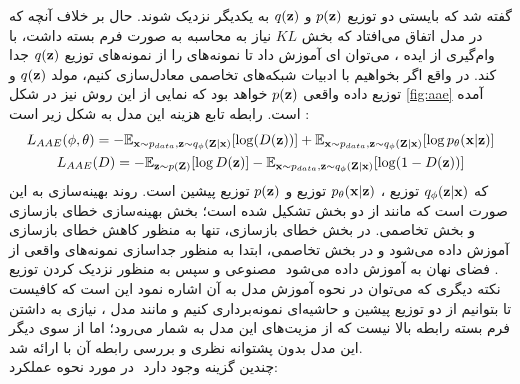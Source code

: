 گفته شد که بایستی دو توزیع $p({\bf z})$ و $q({\bf z})$ به یکدیگر نزدیک شوند. حال بر خلاف آنچه که در مدل \vae{} اتفاق می‌افتاد که بخش $KL$ نیاز به محاسبه به صورت فرم بسته داشت، با وام‌گیری از ایده \gan{}، می‌توان \discriminator ‌ای آموزش داد تا نمونه‌های \priordist{} را از نمونه‌های توزیع \marginal
$q({\bf z})$
جدا کند. در واقع اگر بخواهیم با ادبیات شبکه‌های تخاصمی معادل‌سازی کنیم، مولد $q({\bf z})$ و توزیع داده واقعی $p({\bf z})$ خواهد بود که نمایی از این روش نیز در شکل \ref{fig:aae} آمده است. رابطه تابع هزینه این مدل به شکل زیر است \cite{aae}:
\begin{gather}
	L_{AAE}(\phi, \theta) =
	- \mathbb E_{{\bf x} \sim p_{data}, {\bf z} \sim q_\phi({\bf Z}|{\bf x})} [\log (D({\bf z}))]
	+ \mathbb E_{{\bf x} \sim p_{data}, {\bf z} \sim q_\phi({\bf Z}|{\bf x})}[\log p_\theta({\bf x}|{\bf z})]\\
	L_{AAE}(D) =
	- \mathbb E_{{\bf z} \sim p({\bf Z})} [\log D({\bf z})]
	- \mathbb E_{{\bf x} \sim p_{data},{\bf z} \sim q_\phi({\bf Z}|{\bf x})} [\log (1 - D({\bf z}))]
\end{gather}
که $q_\phi({\bf z}|{\bf x})$ توزیع \encoder{}،
$p_\theta({\bf x}|{\bf z})$
توزیع \decoder{} و $p({\bf z})$ توزیع پیشین است. روند بهینه‌سازی به این صورت است که مانند \gan{} از دو بخش تشکیل شده است؛ بخش بهینه‌سازی خطای بازسازی و بخش تخاصمی. در بخش خطای بازسازی، تنها \autoencoder{} به منظور کاهش خطای بازسازی آموزش داده می‌شود و در بخش تخاصمی، ابتدا \discriminator{} به منظور جداسازی نمونه‌های واقعی از مصنوعی و سپس \encoder{} به منظور نزدیک کردن توزیع \marginal{}‎ فضای نهان به \priordist{} آموزش داده می‌شود \cite{aae}.\\
نکته دیگری که می‌توان در نحوه آموزش مدل به آن اشاره نمود این است که کافیست تا بتوانیم از دو توزیع پیشین و حاشیه‌ای \encoder{} نمونه‌برداری کنیم و مانند مدل \vae{}، نیازی به داشتن فرم بسته رابطه بالا نیست که از مزیت‌های این مدل به شمار می‌رود؛ اما از سوی دیگر این مدل بدون پشتوانه نظری و بررسی رابطه آن با \likelihood{} ارائه شد.\\
در مورد نحوه عملکرد ‎\encoder{}‎ چندین گزینه وجود دارد:
